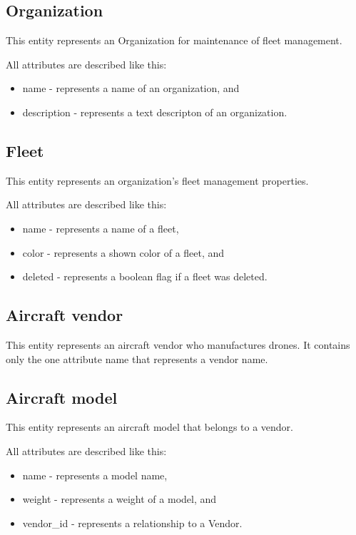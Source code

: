 \subsection{Organization}\label{subsec:organization}
This entity represents an Organization for maintenance of fleet management.

All attributes are described like this:
\begin{itemize}
    \item name - represents a name of an organization, and
    \item description - represents a text descripton of an organization.
\end{itemize}

\subsection{Fleet}\label{subsec:fleet}
This entity represents an organization's fleet management properties.

All attributes are described like this:
\begin{itemize}
    \item name - represents a name of a fleet,
    \item color - represents a shown color of a fleet, and
    \item deleted - represents a boolean flag if a fleet was deleted.
\end{itemize}

\subsection{Aircraft vendor}\label{subsec:aircraft-vendor}
This entity represents an aircraft vendor who manufactures drones.
It contains only the one attribute name that represents a vendor name.

\subsection{Aircraft model}\label{subsec:aircraft-model}
This entity represents an aircraft model that belongs to a vendor.

All attributes are described like this:
\begin{itemize}
    \item name - represents a model name,
    \item weight - represents a weight of a model, and
    \item vendor\_id - represents a relationship to a Vendor.
\end{itemize}

